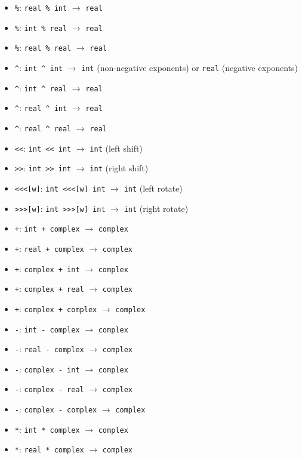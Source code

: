 \begin{itemize}
\item \texttt{\%}: \texttt{real \% int} $\rightarrow$ \texttt{real}
\item \texttt{\%}: \texttt{int \% real} $\rightarrow$ \texttt{real}
\item \texttt{\%}: \texttt{real \% real} $\rightarrow$ \texttt{real}
\item \texttt{\^{}}: \texttt{int \^{} int} $\rightarrow$ \texttt{int} (non-negative exponents) or \texttt{real} (negative exponents)
\item \texttt{\^{}}: \texttt{int \^{} real} $\rightarrow$ \texttt{real}
\item \texttt{\^{}}: \texttt{real \^{} int} $\rightarrow$ \texttt{real}
\item \texttt{\^{}}: \texttt{real \^{} real} $\rightarrow$ \texttt{real}
\item \texttt{<<}: \texttt{int << int} $\rightarrow$ \texttt{int} (left shift)
\item \texttt{>>}: \texttt{int >> int} $\rightarrow$ \texttt{int} (right shift)
\item \texttt{<<<[w]}: \texttt{int <<<[w] int} $\rightarrow$ \texttt{int} (left rotate)
\item \texttt{>>>[w]}: \texttt{int >>>[w] int} $\rightarrow$ \texttt{int} (right rotate)
\item \texttt{+}: \texttt{int + complex} $\rightarrow$ \texttt{complex}
\item \texttt{+}: \texttt{real + complex} $\rightarrow$ \texttt{complex}
\item \texttt{+}: \texttt{complex + int} $\rightarrow$ \texttt{complex}
\item \texttt{+}: \texttt{complex + real} $\rightarrow$ \texttt{complex}
\item \texttt{+}: \texttt{complex + complex} $\rightarrow$ \texttt{complex}
\item \texttt{-}: \texttt{int - complex} $\rightarrow$ \texttt{complex}
\item \texttt{-}: \texttt{real - complex} $\rightarrow$ \texttt{complex}
\item \texttt{-}: \texttt{complex - int} $\rightarrow$ \texttt{complex}
\item \texttt{-}: \texttt{complex - real} $\rightarrow$ \texttt{complex}
\item \texttt{-}: \texttt{complex - complex} $\rightarrow$ \texttt{complex}
\item \texttt{*}: \texttt{int * complex} $\rightarrow$ \texttt{complex}
\item \texttt{*}: \texttt{real * complex} $\rightarrow$ \texttt{complex}

\end{itemize}
